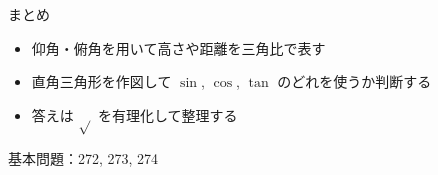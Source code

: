 \documentclass[aspectratio=43,professionalfonts,handout]{beamer}
\begin{document}
\begin{frame}{まとめ}
  \begin{itemize}
    \item 仰角・俯角を用いて高さや距離を三角比で表す
    \item 直角三角形を作図して $\sin$, $\cos$, $\tan$ のどれを使うか判断する
    \item 答えは $\sqrt{}$ を有理化して整理する
  \end{itemize}

  \vfill
  {\small 基本問題：272, 273, 274}
\end{frame}
\end{document}
